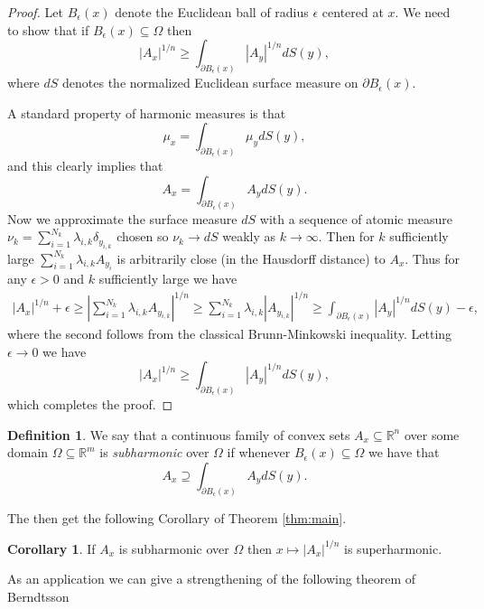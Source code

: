 \documentclass[reqno]{amsart}
\theoremstyle{definition}
\newtheorem{corollary}[theorem]{Corollary}
\theoremstyle{definition}
\theoremstyle{definition}
\newtheorem{definition}[theorem]{Definition}
\begin{document}
\begin{proof}
Let $B_{\epsilon}(x)$ denote the Euclidean ball of radius $\epsilon$ centered at $x$.  We need to show that if $B_{\epsilon}(x)\subseteq \Omega$ then $$|A_x|^{1/n}\geq \int_{\partial B_{\epsilon}(x)}|A_y|^{1/n}dS(y),$$ where $dS$ denotes the normalized Euclidean surface measure on $\partial B_{\epsilon}(x)$.

A standard property of harmonic measures is that $$\mu_x=\int_{\partial B_{\epsilon}(x)}\mu_ydS(y),$$ and this clearly implies that $$A_x=\int_{\partial B_{\epsilon}(x)}A_ydS(y).$$   Now we approximate the surface measure $dS$ with a sequence of atomic measure $\nu_k=\sum_{i=1}^{N_k} \lambda_{i,k} \delta_{y_{i,k}}$ chosen so $\nu_k\to dS$ weakly as $k\to \infty$.  Then for $k$ sufficiently large $\sum_{i=1}^{N_k} \lambda_{i,k} A_{y_i}$ is arbitrarily close (in the Hausdorff distance) to $A_x$.  Thus for any $\epsilon>0$ and $k$ sufficiently large we have
\begin{eqnarray*}
|A_x|^{1/n}+ \epsilon \ge |\sum_{i=1}^{N_k} \lambda_{i,k} A_{y_{i,k}}|^{1/n}\geq \sum_{i=1}^{N_k} \lambda_{i,k}|A_{y_{i,k}}|^{1/n}\ge \int_{\partial B_{\epsilon}(x)}|A_y|^{1/n}dS(y) - \epsilon,
\end{eqnarray*}
where the second follows from the classical Brunn-Minkowski inequality. Letting $\epsilon\to 0$ we have $$|A_x|^{1/n}\geq \int_{\partial B_{\epsilon}(x)}|A_y|^{1/n}dS(y),$$ which completes the proof.
\end{proof}


\begin{definition}
 We say that a continuous family of convex sets $A_x\subseteq \mathbb{R}^n$ over some domain $\Omega\subseteq \mathbb{R}^m$ is \emph{subharmonic} over $\Omega$ if whenever $B_{\epsilon}(x)\subseteq \Omega$ we have that $$A_x\supseteq\int_{\partial B_{\epsilon}(x)}A_ydS(y).$$
\end{definition} 

The then get the following Corollary of Theorem \ref{thm:main}.

\begin{corollary} \label{cor:sub}
If $A_x$ is subharmonic over $\Omega$ then $x\mapsto |A_x|^{1/n}$ is superharmonic.
\end{corollary}

As an application we can give a strengthening of the following theorem of Berndtsson \cite{Berndtsson_Prekopa}
\end{document}
